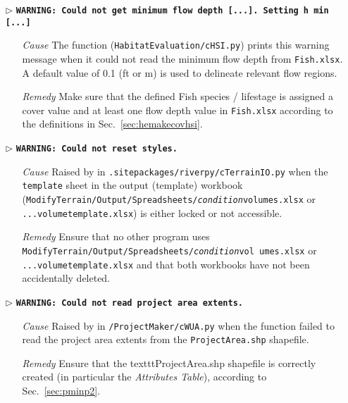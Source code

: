 \begin{itemize}
	\item[$\triangleright$]\textbf{\texttt{WARNING: Could not get minimum flow depth [...]. Setting h min [...]}}
	\begin{itemize}
		\item[\textit{Cause}\hspace{0.27cm}] The  function (\texttt{HabitatEvaluation/cHSI.py}) prints this warning message when it could not read the minimum flow depth from \texttt{Fish.xlsx}. A default value of 0.1 (ft or m) is used to delineate relevant flow regions.
		\item[\textit{Remedy}] Make sure that the defined Fish species / lifestage is assigned a cover value and at least one flow depth value in \texttt{Fish.xlsx} according to the definitions in Sec.~\ref{sec:hemakecovhsi}.\\
	\end{itemize}

	\item[$\triangleright$]\textbf{\texttt{WARNING: Could not reset styles.}}
	\begin{itemize}
		\item[\textit{Cause}\hspace{0.27cm}] Raised by  in \texttt{.site{\myUnderscore}packages/riverpy/cTerrainIO.py} when the \texttt{template} sheet in the output (template) workbook (\texttt{ModifyTerrain/Output/Spreadsheets/\textit{condition}{\myUnderscore}volumes.xlsx} or \texttt{...volume{\myUnderscore}template.xlsx}) is either locked or not accessible.
		\item[\textit{Remedy}] Ensure that no other program uses \texttt{ModifyTerrain/Output/Spreadsheets/\textit{condition}{\myUnderscore}vol umes.xlsx} or \texttt{...volume{\myUnderscore}template.xlsx} and that both workbooks have not been accidentally deleted.\\
	\end{itemize}
	
	\item[$\triangleright$]\textbf{\texttt{WARNING: Could not read project area extents.}}
	\begin{itemize}
		\item[\textit{Cause}\hspace{0.27cm}] Raised by  in \texttt{/ProjectMaker/cWUA.py} when the function failed to read the project area extents from the \texttt{ProjectArea.shp} shapefile.
		\item[\textit{Remedy}] Ensure that the texttt{ProjectArea.shp} shapefile is correctly created (in particular the \textit{Attributes Table}), according to Sec.~\ref{sec:pminp2}.\\		
	\end{itemize}
	

\end{itemize}
